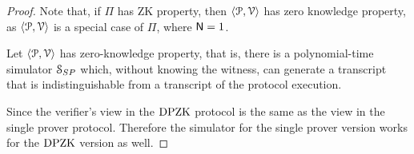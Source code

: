 \begin{proof}
	Note that, if $\Pi$ has ZK property, then $\langle \mathcal{P},\mathcal{V}\rangle$ has zero knowledge property, as $\langle \mathcal{P},\mathcal{V}\rangle$ is a special case of $\Pi$, where $\mathsf{N}=1$. 
	
	Let $\langle \mathcal{P},\mathcal{V}\rangle$ has zero-knowledge property, that is, there is a polynomial-time simulator $\mathcal{S}_{SP}$ which, without knowing the witness, can generate a transcript that is indistinguishable from a transcript of the protocol execution. 
	
	Since the verifier's view in the $\text{DPZK}$ protocol is the same as the view in the single prover protocol. Therefore the simulator for the single prover version works for the $\text{DPZK}$ version as well.
%	
%	
%	
\end{proof}
